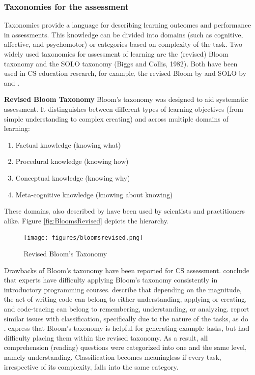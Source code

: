 \subsubsection{Taxonomies for the assessment}\label{sec:taxAssessment}

Taxonomies provide a language for describing learning outcomes and performance in assessments. This knowledge can be divided into domains (such as cognitive, affective, and psychomotor) or categories based on complexity of the task. Two widely used taxonomies for assessment of learning are the (revised) Bloom taxonomy \cite{krathwohl2002revision} and the SOLO taxonomy (Biggs and Collis, 1982). Both have been used in CS education research, for example, the revised Bloom by  and SOLO by  and .


\noindent \textbf{Revised Bloom Taxonomy}\newline
Bloom's taxonomy was designed to aid systematic assessment. It distinguishes between different types of learning objectives (from simple understanding to complex creating) and across multiple domains of learning:
\begin{enumerate}
\item Factual knowledge (knowing what)
\item Procedural knowledge (knowing how)
\item Conceptual knowledge (knowing why)
\item Meta-cognitive knowledge (knowing about knowing)
\end{enumerate}\cite{krathwohl2002revision}
These domains, also described by  have been used by scientists and practitioners alike. Figure \ref{fig:BloomsRevised} depicts the hierarchy.



\begin{figure}
\texttt{[image: figures/bloomsrevised.png]}
\caption{Revised Bloom's Taxonomy}
\end{figure}\label{fig:BloomsRevised}




Drawbacks of Bloom's taxonomy have been reported for CS assessment.  conclude that experts have difficulty applying Bloom's taxonomy consistently in introductory programming courses.  describe that depending on the magnitude, the act of writing code can belong to either understanding, applying or creating, and code-tracing can belong to remembering, understanding, or analyzing.  report similar issues with classification, specifically due to the nature of the tasks, as do \cite{LuxtonReilly2018}.  express that Bloom's taxonomy is helpful for generating example tasks, but had difficulty placing them within the revised taxonomy. As a result, all comprehension (reading) questions were categorized into one and the same level, namely understanding. Classification becomes meaningless if every task, irrespective of its complexity, falls into the same category.
%

